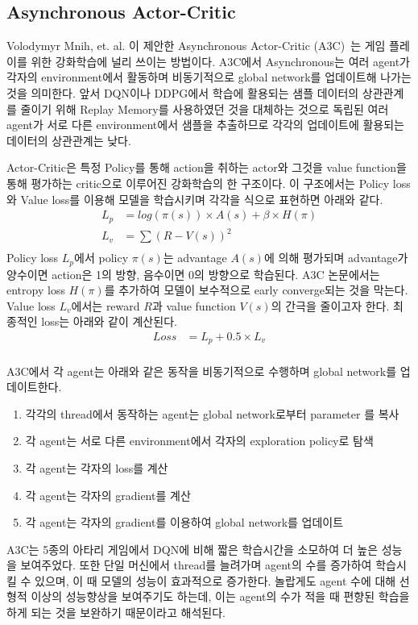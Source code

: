 \subsection{Asynchronous Actor-Critic}
\label{sec:survey:A3C}
Volodymyr Mnih, et. al. 이 제안한 Asynchronous Actor-Critic (A3C)~\cite{A3C}는 게임 플레이를 위한 강화학습에 널리 쓰이는 방법이다.
A3C에서 Asynchronous는 여러 agent가 각자의 environment에서 활동하며 비동기적으로 global network를 업데이트해 나가는 것을 의미한다.
앞서 DQN이나 DDPG에서 학습에 활용되는 샘플 데이터의 상관관계를 줄이기 위해 Replay Memory를 사용하였던 것을 대체하는 것으로 독립된 여러 agent가 서로 다른 environment에서 샘플을 추출하므로 각각의 업데이트에 활용되는 데이터의 상관관계는 낮다.

Actor-Critic은 특정 Policy를 통해 action을 취하는 actor와 그것을 value function을 통해 평가하는 critic으로 이루어진 강화학습의 한 구조이다.
이 구조에서는 Policy loss와 Value loss를 이용해 모델을 학습시키며 각각을 식으로 표현하면 아래와 같다.
\begin{align*}
	L_p &= log(\pi(s)) \times A(s) + \beta \times H(\pi) \\
	L_v &= \sum {(R-V(s))}^2  \\
\end{align*}
Policy loss $L_p$에서 policy $\pi(s)$는 advantage $A(s)$에 의해 평가되며 advantage가 양수이면 action은 1의 방향, 음수이면 0의 방향으로 학습된다.
A3C 논문에서는 entropy loss $H(\pi)$를 추가하여 모델이 보수적으로 early converge되는 것을 막는다.
Value loss $L_v$에서는 reward $R$과 value function $V(s)$의 간극을 줄이고자 한다.
최종적인 loss는 아래와 같이 계산된다.
\begin{align*}
	Loss &= L_p + 0.5 \times L_v \\
\end{align*}

A3C에서 각 agent는 아래와 같은 동작을 비동기적으로 수행하며 global network를 업데이트한다.
\begin{enumerate}
	\item
각각의 thread에서 동작하는 agent는 global network로부터 parameter 를 복사
	\item
각 agent는 서로 다른 environment에서 각자의 exploration policy로 탐색
	\item
각 agent는 각자의 loss를 계산
	\item
각 agent는 각자의 gradient를 계산
	\item
각 agent는 각자의 gradient를 이용하여 global network를 업데이트
\end{enumerate}

A3C는 5종의 아타리 게임에서 DQN에 비해 짧은 학습시간을 소모하여 더 높은 성능을 보여주었다.
또한 단일 머신에서 thread를 늘려가며 agent의 수를 증가하여 학습시킬 수 있으며, 이 때 모델의 성능이 효과적으로 증가한다.
놀랍게도 agent 수에 대해 선형적 이상의 성능향상을 보여주기도 하는데, 이는 agent의 수가 적을 때 편향된 학습을 하게 되는 것을 보완하기 때문이라고 해석된다. 
